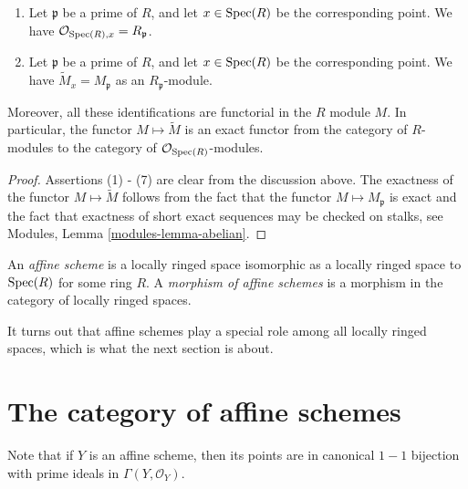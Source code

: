 \begin{lemma}
\begin{enumerate}
are the maps
$R_f \to R_g$ and $M_f \to M_g$ from Lemma
\ref{lemma-standard-open}.
\item Let $\mathfrak p$ be a prime of $R$, and let $x \in \mathop{\mathrm{Spec}}(R)$
be the corresponding point. We have
$\mathcal{O}_{\mathop{\mathrm{Spec}}(R), x} = R_{\mathfrak p}$.
\item Let $\mathfrak p$ be a prime of $R$, and let $x \in \mathop{\mathrm{Spec}}(R)$
be the corresponding point. We have $\widetilde M_x = M_{\mathfrak p}$
as an $R_{\mathfrak p}$-module.
\end{enumerate}
Moreover, all these identifications are functorial in the $R$
module $M$. In particular, the functor $M \mapsto \widetilde M$
is an exact functor from the category of $R$-modules
to the category of $\mathcal{O}_{\mathop{\mathrm{Spec}}(R)}$-modules.
\end{lemma}

\begin{proof}
Assertions (1) - (7) are clear from the discussion above.
The exactness of the functor $M \mapsto \widetilde M$
follows from the fact that the functor $M \mapsto M_{\mathfrak p}$
is exact and the fact that exactness of short exact sequences
may be checked on stalks, see
Modules, Lemma \ref{modules-lemma-abelian}.
\end{proof}

\begin{definition}
\label{definition-affine-scheme}
An {\it affine scheme} is a locally ringed space isomorphic
as a locally ringed space to $\mathop{\mathrm{Spec}}(R)$ for some ring $R$.
A {\it morphism of affine schemes} is a morphism in the category
of locally ringed spaces.
\end{definition}

\noindent
It turns out that affine schemes play a special role
among all locally ringed spaces, which is what the next
section is about.


















\section{The category of affine schemes}
\label{section-category-affine-schemes}

\noindent
Note that if $Y$ is an affine scheme, then its
points are in canonical $1-1$ bijection with
prime ideals in $\Gamma(Y, \mathcal{O}_Y)$.

